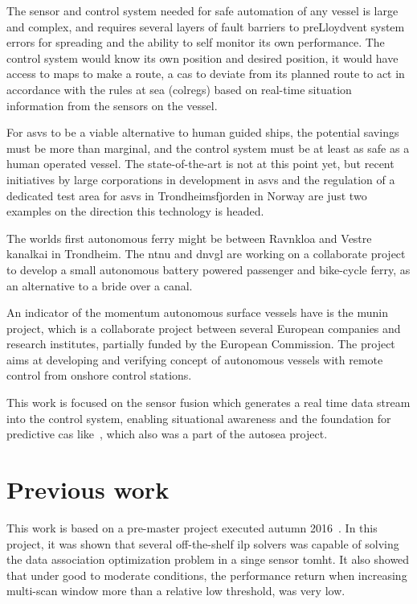 The sensor and control system needed for safe automation of any vessel is large and complex, and requires several layers of fault barriers to preLloydvent system errors for spreading and the ability to self monitor its own performance. The control system would know its own position and desired position, it would have access to maps to make a route, a \gls{cas} to deviate from its planned route to act in accordance with the rules at sea (\gls{colregs}) based on real-time situation information from the sensors on the vessel.

For \glspl{asv} to be a viable alternative to human guided ships, the potential savings must be more than marginal, and the control system must be at least as safe as a human operated vessel. The state-of-the-art is not at this point yet, but recent initiatives by large corporations in development in \glspl{asv} and the regulation of a dedicated test area for \glspl{asv} in Trondheimsfjorden in Norway are just two examples on the direction this technology is headed.

The worlds first autonomous ferry might be between Ravnkloa and Vestre kanalkai in Trondheim. The \gls{ntnu} and \gls{dnvgl} are working on a collaborate project to develop a small autonomous battery powered passenger and bike-cycle ferry, as an alternative to a bride over a canal. 

An indicator of the momentum autonomous surface vessels have is the \gls{munin} project, which is a collaborate project between several European companies and research institutes, partially funded by the European Commission. The project aims at developing and verifying concept of autonomous vessels with remote control from onshore control stations.

This work is focused on the sensor fusion which generates a real time data stream into the control system, enabling situational awareness and the foundation for predictive \gls{cas} like~\cite{Hagen2017}, which also was a part of the \gls{autosea} project.

\section{Previous work}\label{sec:previous_work}
This work is based on a pre-master project executed autumn 2016~\cite{Liland_2017}. In this project, it was shown that several off-the-shelf \gls{ilp} \glspl{solver} was capable of solving the data association optimization problem in a singe sensor \gls{tomht}. It also showed that under good to moderate conditions, the performance return when increasing multi-scan window more than a relative low threshold, was very low.


